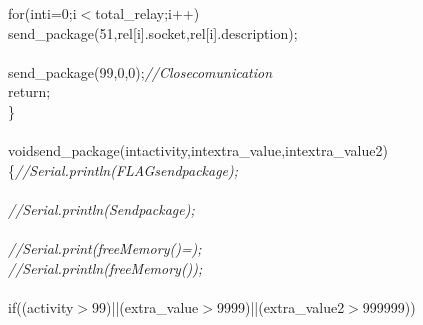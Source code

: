 \documentclass[a4paper, 12pt]{article}
\newcommand\SPC{\hspace*{0.6em}}
\newcommand\QOT{\mbox{\char 34}}
\newcommand{\CppAComment}[1]{\textit{\textcolor[rgb]{0.2,0.4,1}{#1}}}
\newcommand{\CppAIdentifier}[1]{\textcolor[rgb]{0,1,0}{#1}}
\newcommand{\CppANumber}[1]{\textcolor[rgb]{0,0,1}{#1}}
\newcommand{\CppAReservedWord}[1]{\textcolor[rgb]{0,0.5,0}{#1}}
\newcommand{\CppASpace}[1]{\textcolor[rgb]{1,1,1}{\colorbox[rgb]{0,0,0}{#1}}}
\newcommand{\CppASymbol}[1]{\textcolor[rgb]{1,0,0}{#1}}
\begin{document}
\begin{ttfamily}
\CppASpace{\SPC \SPC }\CppAReservedWord{for}\CppASpace{\SPC }\CppASymbol{(}\CppAReservedWord{int}\CppASpace{\SPC }\CppAIdentifier{i}\CppASymbol{=}\CppANumber{0}\CppASymbol{;}\CppASpace{\SPC }\CppAIdentifier{i}\CppASymbol{$<$}\CppAIdentifier{total\_relay}\CppASymbol{;}\CppASpace{\SPC }\CppAIdentifier{i}\CppASymbol{++}\CppASymbol{)}\\
\CppASpace{\SPC \SPC \SPC \SPC }\CppAIdentifier{send\_package}\CppASymbol{(}\CppANumber{51}\CppASymbol{,}\CppASpace{\SPC }\CppAIdentifier{rel}\CppASymbol{[}\CppAIdentifier{i}\CppASymbol{]}\CppASymbol{.}\CppAIdentifier{socket}\CppASymbol{,}\CppASpace{\SPC }\CppAIdentifier{rel}\CppASymbol{[}\CppAIdentifier{i}\CppASymbol{]}\CppASymbol{.}\CppAIdentifier{description}\CppASpace{\SPC }\CppASymbol{)}\CppASymbol{;}\\
\CppASpace{\SPC \SPC }\\
\CppASpace{\SPC \SPC }\CppAIdentifier{send\_package}\CppASymbol{(}\CppANumber{99}\CppASymbol{,}\CppASpace{\SPC }\CppANumber{0}\CppASymbol{,}\CppASpace{\SPC }\CppANumber{0}\CppASymbol{)}\CppASymbol{;}\CppASpace{\SPC }\CppAComment{//Close\SPC comunication}\\
\CppAReservedWord{return}\CppASymbol{;}\\
\CppASymbol{\}}\\
\\
\CppAReservedWord{void}\CppASpace{\SPC }\CppAIdentifier{send\_package}\CppASymbol{(}\CppAReservedWord{int}\CppASpace{\SPC }\CppAIdentifier{activity}\CppASymbol{,}\CppASpace{\SPC }\CppAReservedWord{int}\CppASpace{\SPC }\CppAIdentifier{extra\_value}\CppASymbol{,}\CppASpace{\SPC }\CppAReservedWord{int}\CppASpace{\SPC }\CppAIdentifier{extra\_value2}\CppASymbol{)}\\
\CppASymbol{\{}\CppASpace{\SPC }\CppAComment{//Serial.println(\QOT FLAG\SPC send\SPC package\QOT );\SPC }\\
\CppASpace{\SPC \SPC }\\
\CppASpace{\SPC \SPC }\CppAComment{//Serial.println(\QOT Send\SPC package\QOT );}\\
\CppASpace{\SPC \SPC }\\
\CppASpace{\SPC \SPC }\CppAComment{//Serial.print(\QOT freeMemory()=\QOT );}\\
\CppASpace{\SPC \SPC }\CppAComment{//Serial.println(freeMemory());}\\
\CppASpace{\SPC \SPC }\\
\CppASpace{\SPC \SPC }\CppAReservedWord{if}\CppASpace{\SPC }\CppASymbol{(}\CppASymbol{(}\CppAIdentifier{activity}\CppASymbol{$>$}\CppANumber{99}\CppASymbol{)}\CppASymbol{||}\CppASymbol{(}\CppAIdentifier{extra\_value}\CppASymbol{$>$}\CppANumber{9999}\CppASymbol{)}\CppASymbol{||}\CppASymbol{(}\CppAIdentifier{extra\_value2}\CppASymbol{$>$}\CppANumber{999999}\CppASymbol{)}\CppASymbol{)}\\

\end{ttfamily}
\end{document}
